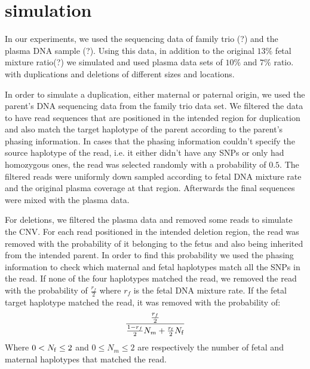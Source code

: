 \section{simulation}

	In our experiments, we used the sequencing data of family trio (?) and the plasma DNA sample (?). Using this data, in addition to the original $13\%$ fetal mixture ratio(?) we simulated and used plasma data sets of $10\%$ and $7\%$ ratio. with duplications and deletions of different sizes and locations.

	In order to simulate a duplication, either maternal or paternal origin, we used the parent's DNA sequencing data from the family trio data set. We filtered the data to have read sequences that are positioned in the intended region for duplication and also match the target haplotype of the parent according to the parent's phasing information.	In cases that the phasing information couldn't specify the source haplotype of the read, i.e. it either didn't have any SNPs or only had homozygous ones, the read was selected randomly with a probability of $0.5$. The filtered reads were uniformly down sampled according to fetal DNA mixture rate and the original plasma coverage at that region. Afterwards the final sequences were mixed with the plasma data.
	
	For deletions, we filtered the plasma data and removed some reads to simulate the CNV. For each read positioned in the intended deletion region, the read was removed with the probability of it belonging to the fetus and also being inherited from the intended parent. In order to find this probability we used the phasing information to check which maternal and fetal haplotypes match all the SNPs in the read. If none of the four haplotypes matched the read, we removed the read with the probability of $\frac{r_f}{2}$ where $r_f$ is the fetal DNA mixture rate. If the fetal target haplotype matched the read, it was removed with the probability of:
	$$\frac{ \frac{r_f}{2} } { \frac{1-r_f}{2} N_m + \frac{r_{\mathrm{f}}}{2} N_{\mathrm{f}}}$$
	Where $0 < N_{\mathrm{f}} \leq 2$ and $0 \leq N_m \leq 2$ are respectively the number of fetal and maternal haplotypes that matched the read.
	
